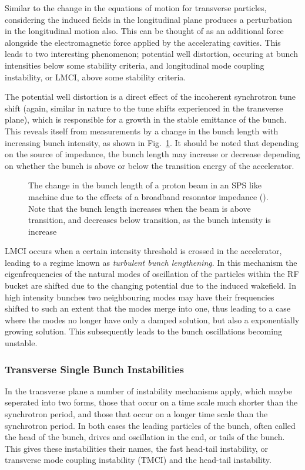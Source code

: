 Similar to the change in the equations of motion for transverse particles, considering the induced fields in the longitudinal plane produces a perturbation in the longitudinal motion also. This can be thought of as an additional force alongside the electromagnetic force applied by the accelerating cavities. This leads to two interesting phenomenon; potential well distortion, occuring at bunch intensities below some stability criteria, and longitudinal mode coupling instability, or LMCI, above some stability criteria.

The potential well distortion is a direct effect of the incoherent synchrotron tune shift (again, similar in nature to the tune shifts experienced in the transverse plane), which is responsible for a growth in the stable emittance of the bunch. This reveals itself from measurements by a change in the bunch length with increasing bunch intensity, as shown in Fig.~\ref{fig:pot_well_dist}. It should be noted that depending on the source of impedance, the bunch length may increase or decrease depending on whether the bunch is above or below the transition energy of the accelerator.

\begin{figure}
\caption{The change in the bunch length of a proton beam in an SPS like machine due to the effects of a broadband resonator impedance (). Note that the bunch length increases when the beam is above transition, and decreases below transition, as the bunch intensity is increase}
\label{fig:pot_well_dist}
\end{figure}

LMCI occurs when a certain intensity threshold is crossed in the accelerator, leading to a regime known as \emph{turbulent bunch lengthening}. In this mechanism the eigenfrequencies of the natural modes of oscillation of the particles within the RF bucket are shifted due to the changing potential due to the induced wakefield. In high intensity bunches two neighbouring modes may have their frequencies shifted to such an extent that the modes merge into one, thus leading to a case where the modes no longer have only a damped solution, but also a exponentially growing solution. This subsequently leads to the bunch oscillations becoming unstable.

\subsubsection{Transverse Single Bunch Instabilities}

In the transverse plane a number of instability mechanisms apply, which maybe seperated into two forms, those that occur on a time scale much shorter than the synchrotron period, and those that occur on a longer time scale than the synchrotron period. In both cases the leading particles of the bunch, often called the head of the bunch, drives and oscillation in the end, or tails of the bunch. This gives these instabilities their names, the fast head-tail instability, or transverse mode coupling instability (TMCI) and the head-tail instability.


